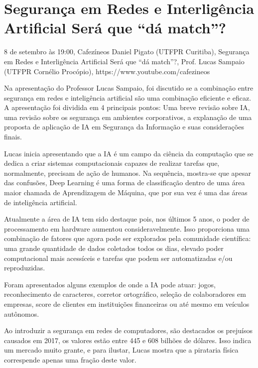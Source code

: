 \section{Segurança em Redes e Interligência Artificial Será que ``dá match''?}

\begin{center}
  \vspace{1cm}
  8 de setembro às 19:00, Cafezíneos Daniel Pigato (UTFPR Curitiba), Segurança em Redes e Interligência Artificial Será que ``dá match''?, Prof. Lucas Sampaio (UTFPR Cornélio Procópio), https://www.youtube.com/cafezineos
  \vspace{1cm}
\end{center}

Na apresentação do Professor Lucas Sampaio, foi discutido se a combinação entre segurança em redes e inteligência artificial são uma combinação eficiente e eficaz. A apresentação foi dividida em 4 principais pontos: Uma breve revisão sobre IA, uma revisão sobre os segurança em ambientes corporativos, a explanação de uma proposta de aplicação de IA em Segurança da Informação e suas considerações finais.

Lucas inicia apresentando que a IA é um campo da ciência da computação que se dedica a criar sistemas computacionais capazes de realizar tarefas que, normalmente, precisam de ação de humanos. Na sequência, mostra-se que apesar das confusões, Deep Learning é uma forma de classificação dentro de uma área maior chamada de Aprendizagem de Máquina, que por sua vez é uma das áreas de inteligência artificial.

Atualmente a área de IA tem sido destaque pois, nos últimos 5 anos, o poder de processamento em hardware aumentou consideravelmente. Isso proporciona uma combinação de fatores que agora pode ser explorados pela comunidade científica: uma grande quantidade de dados coletados todos os dias, elevado poder computacional mais acessíceis e tarefas que podem ser automatizadas e/ou reproduzidas.

Foram apresentados alguns exemplos de onde a IA pode atuar: jogos, reconhecimento de caracteres, corretor ortográfico, seleção de colaboradores em empresas, score de clientes em instituições financeiras ou até mesmo em veículos autônomos.

Ao introduzir a segurança em redes de computadores, são destacados os prejuísos causados em 2017, os valores estão entre 445 e 608 bilhões de dólares. Isso indica um mercado muito grante, e para ilustar, Lucas mostra que a pirataria física correspende apenas uma fração deste valor.

